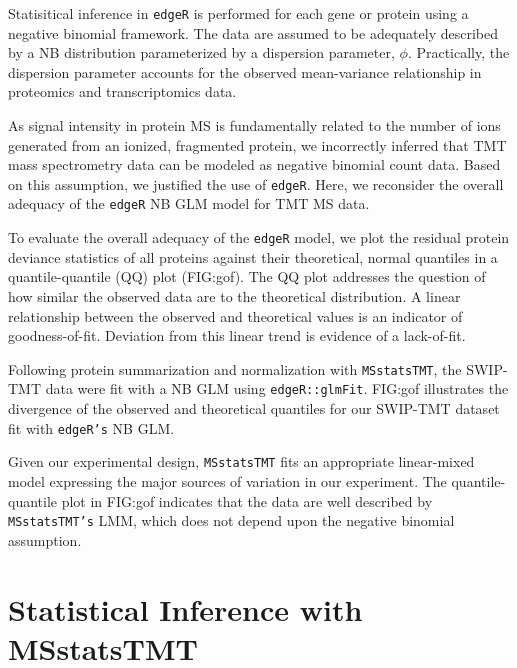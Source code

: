 \documentclass[11pt]{elife}
\begin{document}
Statisitical inference in \texttt{edgeR} is performed for each gene or protein 
using a negative binomial framework. The data are assumed to 
be adequately described by a NB distribution parameterized by a dispersion 
parameter, $\phi$. Practically, the dispersion parameter accounts for the
observed mean-variance relationship in proteomics and transcriptomics data.

As signal intensity in protein MS is fundamentally related to the number of ions generated from
an ionized, fragmented protein, we incorrectly inferred that TMT
mass spectrometry data can be modeled as negative binomial count data. Based on
this assumption, we justified the use of \texttt{edgeR}.  Here, we reconsider
the overall adequacy of the \texttt{edgeR} NB GLM model for TMT MS data.

To evaluate the overall adequacy of the \texttt{edgeR} model, we plot the
residual protein deviance statistics of all proteins against their theoretical,
normal quantiles in a quantile-quantile (QQ) plot (FIG:gof).  The QQ plot
addresses the question of how similar the observed data are to the theoretical
distribution.  A linear relationship between the observed and theoretical
values is an indicator of goodness-of-fit.  Deviation from this linear trend is
evidence of a lack-of-fit.

Following protein summarization and normalization with \texttt{MSstatsTMT}, the
SWIP-TMT data were fit with a NB GLM using \texttt{edgeR::glmFit}. FIG:gof illustrates
the divergence of the observed and theoretical quantiles for our SWIP-TMT
dataset fit with \texttt{edgeR's} NB GLM.

Given our experimental design, \texttt{MSstatsTMT} fits an
appropriate linear-mixed model expressing the major sources of variation in our
experiment.  The quantile-quantile plot in FIG:gof indicates that the data are
well described by \texttt{MSstatsTMT's} LMM, which does not depend
upon the negative binomial assumption.


\section{Statistical Inference with MSstatsTMT}
\end{document}
